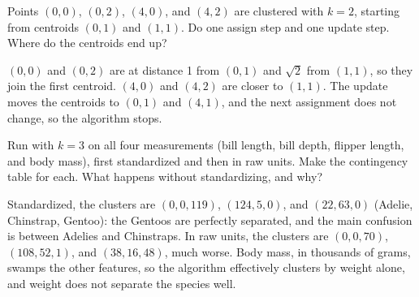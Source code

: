 \begin{Exercise}[label=km3, title={Two-dimensional step}, space=3cm]
Points $(0,0)$, $(0,2)$, $(4,0)$, and $(4,2)$ are clustered with $k = 2$, starting from centroids $(0,1)$ and
$(1,1)$. Do one assign step and one update step. Where do the centroids end up?
\end{Exercise}
\begin{Answer}[ref=km3]
$(0,0)$ and $(0,2)$ are at distance 1 from $(0,1)$ and $\sqrt{2}$ from $(1,1)$, so they join the first centroid.
$(4,0)$ and $(4,2)$ are closer to $(1,1)$. The update moves the centroids to $(0,1)$ and $(4,1)$, and the next
assignment does not change, so the algorithm stops.
\end{Answer}

\begin{Exercise}[label=km4, title={Does scaling matter?}]
Run  with $k = 3$ on all four measurements (bill length, bill depth, flipper length, and body
mass), first standardized and then in raw units. Make the contingency table for each. What happens without
standardizing, and why?
\end{Exercise}
\begin{Answer}[ref=km4]
Standardized, the clusters are $(0, 0, 119)$, $(124, 5, 0)$, and $(22, 63, 0)$ (Adelie, Chinstrap, Gentoo): the
Gentoos are perfectly separated, and the main confusion is between Adelies and Chinstraps. In raw units, the
clusters are $(0, 0, 70)$, $(108, 52, 1)$, and $(38, 16, 48)$, much worse. Body mass, in thousands of grams, swamps
the other features, so the algorithm effectively clusters by weight alone, and weight does not separate the
species well.
\end{Answer}
